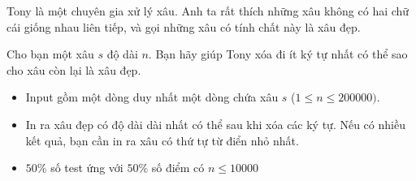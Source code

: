 \documentclass[12pt,a4paper,oneside]{article}
\begin{document}

\renewcommand{\baselinestretch}{1.25}
\setlength{\parskip}{0.5em}

\smallbreak\smallskip%

\renewcommand{\baselinestretch}{1.0}
\setlength{\parskip}{0.25em}
Tony là một chuyên gia xử lý xâu. Anh ta rất thích những xâu không có hai chữ cái giống nhau liên tiếp, và gọi những xâu có tính chất này là xâu đẹp. 

Cho bạn một xâu $s$ độ dài $n$. Bạn hãy giúp Tony xóa đi ít ký tự nhất có thể sao cho xâu còn lại là xâu đẹp. 



\begin{itemize}
    \item Input gồm một dòng duy nhất một dòng chứa xâu $s$ ($1 \le n \le 200000)$.
\end{itemize}


\begin{itemize}
    \item In ra xâu đẹp có độ dài dài nhất có thể sau khi xóa các ký tự. Nếu có nhiều kết quả, bạn cần in ra xâu có thứ tự từ điển nhỏ nhất.
\end{itemize}


\begin{example}
\end{example}

\begin{itemize}
    \item $50\%$ số test ứng với $50\%$ số điểm có $n \le 10000$
\end{itemize}
\end{document}
